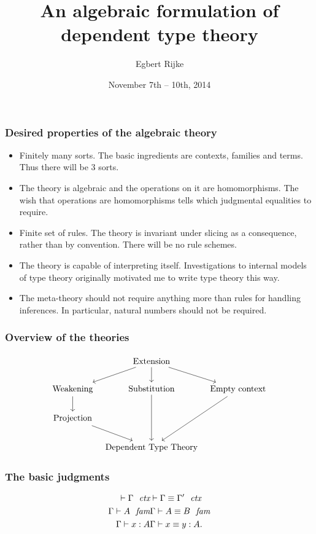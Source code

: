 \documentclass[handout]{beamer}
\title{An algebraic formulation of dependent type theory}
\author{Egbert Rijke}
\institute{Carnegie Mellon University}
\date{November 7th -- 10th, 2014}
\begin{document}
\begin{frame}
\titlepage
\end{frame}

\begin{frame}
\frametitle{Desired properties of the algebraic theory}
\begin{itemize}
\item Finitely many sorts. The basic ingredients are contexts, families and
terms. Thus there will be 3 sorts.
\pause
\item The theory is algebraic and the operations on it are homomorphisms. The
wish that operations are homomorphisms tells which judgmental equalities to
require.
\pause
\item Finite set of rules. The theory is invariant under slicing as a consequence, rather than by
convention. There will be no rule schemes.
\pause
\item The theory is capable of interpreting itself. Investigations to internal
models of type theory originally motivated me to write type theory this way.
\pause
\item The meta-theory should not require anything more than rules for handling
inferences. In particular, natural numbers should not be required.
\end{itemize}
\end{frame}

\begin{frame}
\frametitle{Overview of the theories}
\begin{equation*}
\begin{tikzcd}[ampersand replacement=\&,column sep=tiny]
{} \& \text{Extension} \ar{dr} \ar{d} \ar{dl}
  \\
\text{Weakening} \ar{d} \& \text{Substitution} \ar{dd} \& \text{Empty context} \ar{ddl}
\\
\text{Projection} \ar{dr}
\\
{} \& \text{Dependent Type Theory}
\end{tikzcd}
\end{equation*}
\end{frame}

\begin{frame}
\frametitle{The basic judgments}
\begin{align*}
\jalign\jctx{\Gamma} 
& \jalign\jctxeq{\Gamma}{\Gamma'}
  \\
\jalign\jfam{\Gamma}{A} 
& \jalign\jfameq{\Gamma}{A}{B}
  \\
\jalign\jterm{\Gamma}{A}{x} 
& \jalign\jtermeq{\Gamma}{A}{x}{y}.
\end{align*}
\end{frame}
\end{document}
